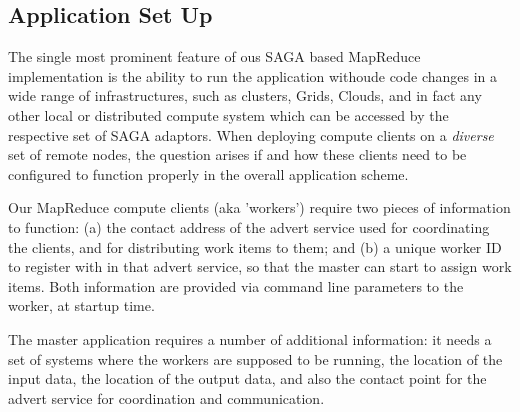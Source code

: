 \documentclass[conference,final]{IEEEtran}
\newcommand{\I}[1]{\textit{#1}}
\begin{document}
\subsection{Application Set Up}
The single most prominent feature of ous SAGA based MapReduce
implementation is the ability to run the application withoude code
changes in a wide range of infrastructures, such as clusters, Grids,
Clouds, and in fact any other local or distributed compute system
which can be accessed by the respective set of SAGA adaptors.  When
deploying compute clients on a \I{diverse} set of remote nodes, the
question arises if and how these clients need to be configured to
function properly in the overall application scheme.

 Our MapReduce compute clients (aka 'workers') require two 
 pieces of information to function: (a) the contact address of the
 advert service used for coordinating the clients, and for
 distributing work items to them; and (b) a unique worker ID to
 register with in that advert service, so that the master can start to
 assign work items.  Both information are provided via command line
 parameters to the worker, at startup time.

 The master application requires a number of additional information:
 it needs a set of systems where the workers are supposed to be
 running, the location of the input data, the location of the output
 data, and also the contact point for the advert service for
 coordination and communication.


    
  
  
  
  
\end{document}
